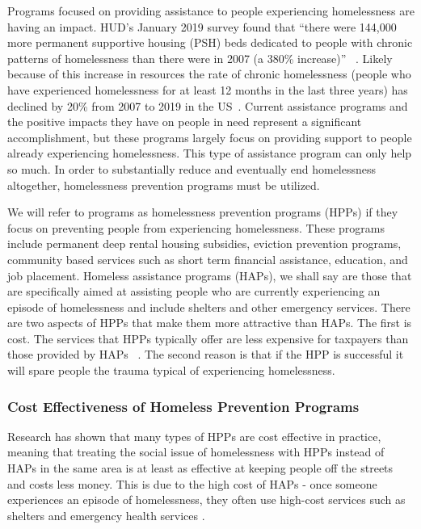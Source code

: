 \documentclass[10pt,letterpaper]{article}
\newcommand{\red}[1]{{\color{red}{#1}}}
\begin{document}
Programs focused on providing assistance to people experiencing homelessness are having an impact. HUD's January 2019 survey found that ``there were 144,000 more permanent supportive housing (PSH) beds dedicated to people with chronic patterns of homelessness than there were in 2007 (a 380\% increase)'' ~\cite{2019AHAR}. Likely because of this increase in resources the rate of chronic homelessness (people who have experienced homelessness for at least 12 months in the last three years) has declined by 20\% from 2007 to 2019 in the US~\cite{2019AHAR}. Current assistance programs and the positive impacts they have on people in need represent a significant accomplishment, but these programs largely focus on providing support to people already experiencing homelessness. This type of assistance program can only help so much. In order to substantially reduce and eventually end homelessness altogether, homelessness prevention programs must be utilized. 

We will refer to programs as homelessness prevention programs (HPPs) if they focus on preventing people from experiencing homelessness. These programs include permanent deep rental housing subsidies, eviction prevention programs, community based services such as short term financial assistance, education, and job placement. Homeless assistance programs (HAPs), we shall say are those that are specifically aimed at assisting people who are currently experiencing an episode of homelessness and include shelters and other emergency services. There are two aspects of HPPs that make them more attractive than HAPs. The first is cost. The services that HPPs typically offer are less expensive for taxpayers than those provided by HAPs ~\cite{shinn2019homelessness}. The second reason is that if the HPP is successful it will spare people the trauma typical of experiencing homelessness.

\subsubsection*{Cost Effectiveness of Homeless Prevention Programs}
Research has shown that many types of HPPs are cost effective in practice, meaning that treating the social issue of homelessness with HPPs instead of HAPs in the same area is at least as effective at keeping people off the streets and costs less money. This is due to the high cost of HAPs - once someone experiences an episode of homelessness, they often use high-cost services such as shelters and emergency health services \red{add source}.
\end{document}

